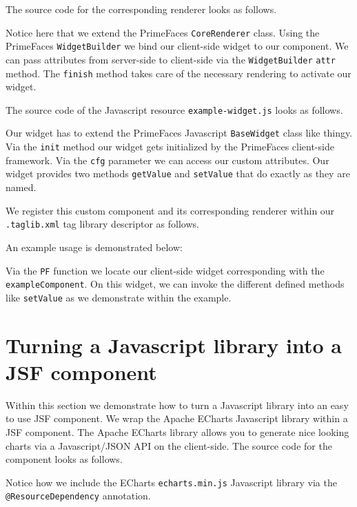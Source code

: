 The source code for the corresponding renderer looks as follows.

Notice here that we extend the PrimeFaces \texttt{CoreRenderer} class.
Using the PrimeFaces \texttt{WidgetBuilder} we bind our client-side widget to our component.
We can pass attributes from server-side to client-side via the \texttt{WidgetBuilder} \texttt{attr} method.
The \texttt{finish} method takes care of the necessary rendering to activate our widget.

The source code of the Javascript resource \texttt{example-widget.js} looks as follows.

Our widget has to extend the PrimeFaces Javascript \texttt{BaseWidget} class like thingy.
Via the \texttt{init} method our widget gets initialized by the PrimeFaces client-side framework.
Via the \texttt{cfg} parameter we can access our custom attributes.
Our widget provides two methods \texttt{getValue} and \texttt{setValue} that do exactly as they are named.

We register this custom component and its corresponding renderer within our \texttt{.taglib\allowbreak .xml} tag library descriptor as follows.


An example usage is demonstrated below:

Via the \texttt{PF} function we locate our client-side widget corresponding with the \texttt{example\allowbreak Component}.
On this widget, we can invoke the different defined methods like \texttt{setValue} as we demonstrate within the example.

\section{Turning a Javascript library into a JSF component}
Within this section we demonstrate how to turn a Javascript library into an easy to use JSF component.
We wrap the Apache ECharts \cite{ECharts} Javascript library within a JSF component.
The Apache ECharts library allows you to generate nice looking charts via a Javascript/JSON API on the client-side.
The source code for the component looks as follows.

Notice how we include the ECharts \texttt{echarts.min.js} Javascript library via the \texttt{@Resource\allowbreak Dependency} annotation.

